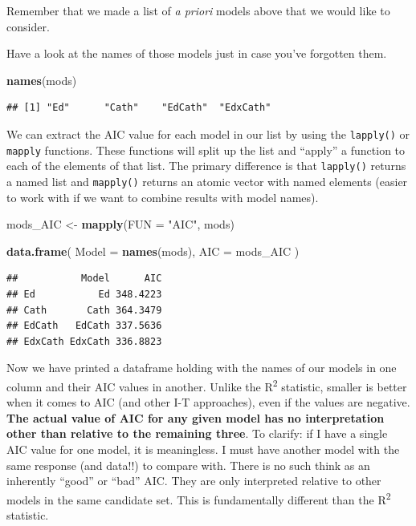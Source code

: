 \documentclass[
]{book}
\newenvironment{Shaded}{\begin{snugshade}}{\end{snugshade}}
\newcommand{\DataTypeTok}[1]{\textcolor[rgb]{0.13,0.29,0.53}{#1}}
\newcommand{\KeywordTok}[1]{\textcolor[rgb]{0.13,0.29,0.53}{\textbf{#1}}}
\newcommand{\NormalTok}[1]{#1}
\newcommand{\StringTok}[1]{\textcolor[rgb]{0.31,0.60,0.02}{#1}}
\begin{document}
Remember that we made a list of \emph{a priori} models above that we would like to consider.

Have a look at the names of those models just in case you've forgotten them.

\begin{Shaded}
\begin{Highlighting}[]
\KeywordTok{names}\NormalTok{(mods)}
\end{Highlighting}
\end{Shaded}

\begin{verbatim}
## [1] "Ed"      "Cath"    "EdCath"  "EdxCath"
\end{verbatim}

We can extract the AIC value for each model in our list by using the \texttt{lapply()} or \texttt{mapply} functions. These functions will split up the list and ``apply'' a function to each of the elements of that list. The primary difference is that \texttt{lapply()} returns a named list and \texttt{mapply()} returns an atomic vector with named elements (easier to work with if we want to combine results with model names).

\begin{Shaded}
\begin{Highlighting}[]
\NormalTok{mods_AIC <-}\StringTok{ }\KeywordTok{mapply}\NormalTok{(}\DataTypeTok{FUN =} \StringTok{"AIC"}\NormalTok{, mods)}

\KeywordTok{data.frame}\NormalTok{(}
  \DataTypeTok{Model =} \KeywordTok{names}\NormalTok{(mods),}
  \DataTypeTok{AIC =}\NormalTok{ mods_AIC}
\NormalTok{)}
\end{Highlighting}
\end{Shaded}

\begin{verbatim}
##           Model      AIC
## Ed           Ed 348.4223
## Cath       Cath 364.3479
## EdCath   EdCath 337.5636
## EdxCath EdxCath 336.8823
\end{verbatim}

Now we have printed a dataframe holding with the names of our models in one column and their AIC values in another. Unlike the R\textsuperscript{2} statistic, smaller is better when it comes to AIC (and other I-T approaches), even if the values are negative. \textbf{The actual value of AIC for any given model has no interpretation other than relative to the remaining three}. To clarify: if I have a single AIC value for one model, it is meaningless. I must have another model with the same response (and data!!) to compare with. There is no such think as an inherently ``good'' or ``bad'' AIC. They are only interpreted relative to other models in the same candidate set. This is fundamentally different than the R\textsuperscript{2} statistic.
\end{document}
